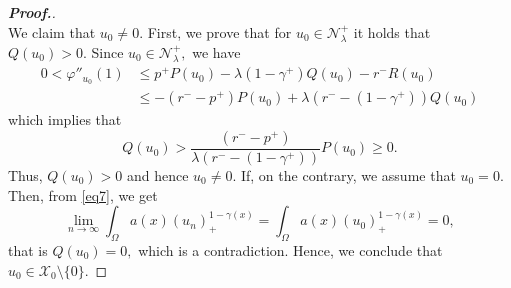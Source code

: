 \documentclass[11pt]{article}
\newcommand{\X}{\mathcal{X}_{0}}
\newcommand{\Nh}{\mathcal{N}_\la}
\newcommand{\ga} {\gamma}
\newcommand{\om} {\Omega}
\newcommand{\la} {\lambda}
\begin{document}
\begin{proof}[\bf Proof.]
\begin{equation}
  \end{equation}
  We claim that $u_0\neq0.$
First, we prove that for $u_0\in \Nh^+$
it holds that $Q(u_0)>0.$
Since $u_0\in \Nh^+,$
we have
   \begin{align*}
0<\varphi''_{u_0}(1)&\le p^+P(u_0)-\la(1-\ga^+)Q(u_0)-r^-R(u_0)\\
        &\le -(r^--p^+)P(u_0)+\la(r^--(1-\ga^+))Q(u_0)
    \end{align*}
    which implies that
    $$Q(u_0)> 
\frac{(r^--p^+)}{\la(r^--(1-\ga^+))}P(u_0)\geq 0.$$
    Thus, $Q(u_0)>0$
and hence $u_0\ne0.$
If, on the contrary, we assume that $u_0=0.$
Then, from \eqref{eq7}, we get
    \begin{equation*}
    \lim_{n\to\infty}
\int_\om a(x)(u_n)_+^{1-\ga(x)}=
\int_\om a(x)(u_0)_+^{1-\ga(x)}=0,
  \end{equation*}
  that is $Q(u_0)=0,$
which is a contradiction.
Hence, we conclude that $u_0\in\X\setminus\{0\}.$


\end{proof}
\end{document}
